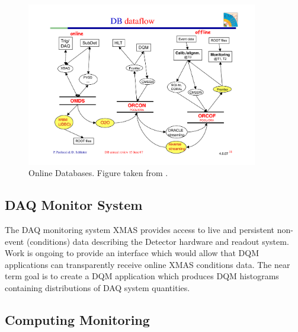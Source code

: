 \documentclass[a4paper]{cmspaper}
\begin{document}
\begin{figure}[!htbp]
\begin{center}
\includegraphics[width=0.9\textwidth]{DB}
\caption{Online Databases. Figure taken from \cite{talk:pigi}.}
\end{center}
\label{fig:database}
\end{figure}


\subsection{DAQ Monitor System}

The DAQ monitoring system XMAS provides access to live and persistent non-event 
(conditions) data describing the Detector hardware and readout system.
Work is ongoing to provide an interface which would allow that DQM applications 
can transparently receive online XMAS conditions data.
The near term goal is to create a DQM application which produces DQM histograms
containing distributions of DAQ system quantities.

\subsection{Computing Monitoring}

\end{document}
